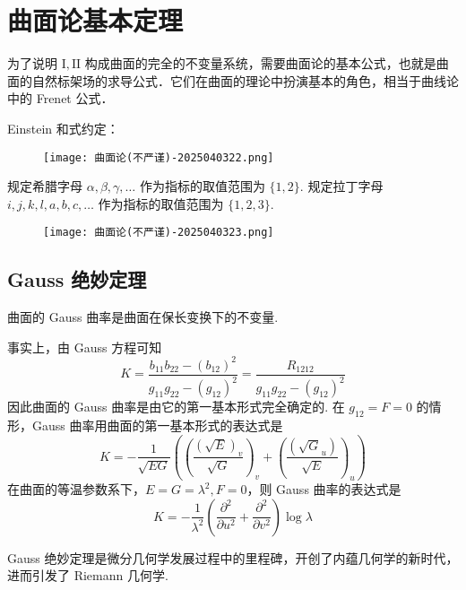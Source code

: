 \section{曲面论基本定理}

为了说明 $\mathrm{I},\mathrm{II}$ 构成曲面的完全的不变量系统，需要曲面论的基本公式，也就是曲面的自然标架场的求导公式．它们在曲面的理论中扮演基本的角色，相当于曲线论中的 Frenet 公式．

Einstein 和式约定：
\begin{figure}[H]
\centering
\texttt{[image: 曲面论(不严谨)-2025040322.png]}
\label{}
\end{figure}

规定希腊字母 $\alpha,\beta,\gamma, \dots$ 作为指标的取值范围为 $\{ 1,2 \}$. 规定拉丁字母 $i,j,k,l,a,b,c,\dots$ 作为指标的取值范围为 $\{ 1,2,3 \}$.

\begin{figure}[H]
\centering
\texttt{[image: 曲面论(不严谨)-2025040323.png]}
\label{}
\end{figure}

\subsection{Gauss 绝妙定理}

\begin{theorem}
曲面的 Gauss 曲率是曲面在保长变换下的不变量.
\end{theorem}
事实上，由 Gauss 方程可知
\[
K=\frac{b_{11}b_{22}-(b_{12})^2}{g_{11}g_{22}-(g_{12})^2}=\frac{R_{1212}}{g_{11}g_{22}-(g_{12})^2}
\]
因此曲面的 Gauss 曲率是由它的第一基本形式完全确定的. 在 $g_{12}=F=0$ 的情形，Gauss 曲率用曲面的第一基本形式的表达式是
\[
K=-\frac{1}{\sqrt{ EG }}\left( \left( \frac{(\sqrt{ E })_{v}}{\sqrt{ G }} \right)_{v}+\left( \frac{(\sqrt{ G }_{u})}{\sqrt{ E }} \right)_{u} \right)
\]
在曲面的等温参数系下，$E=G=\lambda^{2},F=0$，则 Gauss 曲率的表达式是
\[
K=-\frac{1}{\lambda^{2}}\left( \frac{ \partial^2   }{ \partial u ^2 } +\frac{ \partial^2   }{ \partial v ^2 }  \right)\log\lambda
\]
\begin{remark}
Gauss 绝妙定理是微分几何学发展过程中的里程碑，开创了内蕴几何学的新时代，进而引发了 Riemann 几何学.
\end{remark}